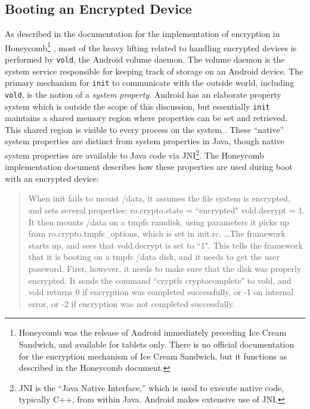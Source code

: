 \subsection{Booting an Encrypted Device} \label{ssec:encryptionboot}

As described in the documentation for the implementation of encryption in Honeycomb\footnote{Honeycomb was the release of Android
immediately preceding Ice Cream Sandwich, and available for tablets only. There is no official documentation for the encryption
mechanism of Ice Cream Sandwich, but it functions as described in the Honeycomb document.} \cite{honeycombcrypt}, most of the heavy
lifting related to handling encrypted devices is performed by \texttt{vold}, the Android volume daemon. The volume daemon is the
system service responsible for keeping track of storage on an Android device. The primary mechanism for \texttt{init} to communicate
with the outside world, including \texttt{vold}, is the notion of a \emph{system property}.  Android has an elaborate property system
which is outside the scope of this discussion, but essentially \texttt{init} maintains a shared memory region where properties can
be set and retrieved. This shared region is visible to every process on the system \cite{propertysystem}. These ``native'' system
properties are distinct from system properties in Java, though native system properties are available to Java code via
JNI\footnote{JNI is the ``Java Native Interface,'' which is used to execute native code, typically C++, from within Java. Android
makes extensive use of JNI.}. The Honeycomb implementation document describes how these properties are used during boot with an
encrypted device:

\begin{quote} When init fails to mount /data, it assumes the file system is encrypted, and sets several properties: ro.crypto.state =
``encrypted" vold.decrypt = 1. It then mounts /data on a tmpfs ramdisk, using parameters it picks up from ro.crypto.tmpfs\_options,
which is set in init.rc.  \ldots The framework starts up, and sees that vold.decrypt is set to ``1". This tells the framework that it
is booting on a tmpfs /data disk, and it needs to get the user password. First, however, it needs to make sure that the disk was
properly encrypted. It sends the command ``cryptfs cryptocomplete" to vold, and vold returns 0 if encryption was completed
successfully, or -1 on internal error, or -2 if encryption was not completed successfully. \cite{honeycombcrypt}
\end{quote}

